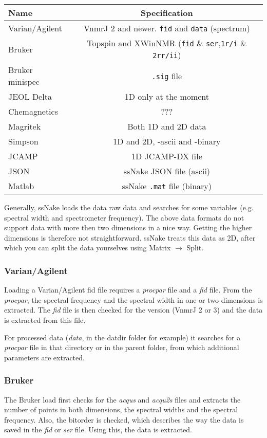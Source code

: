 \documentclass[11pt,a4paper]{article}
\begin{document}
\begin{center}
\begin{tabular}{lc}
\toprule
Name & Specification \\
\midrule
\rowcolor{gray!30!white}
Varian/Agilent & VnmrJ 2 and newer. \texttt{fid} and \texttt{data} (spectrum)\\
Bruker & Topspin and XWinNMR (\texttt{fid} \& \texttt{ser},\texttt{1r/i} \& \texttt{2rr/ii}) \\
\rowcolor{gray!30!white}
Bruker minispec  & \texttt{.sig} file\\
JEOL Delta & 1D only at the moment \\
\rowcolor{gray!30!white}
Chemagnetics & ??? \\
Magritek & Both 1D and 2D data \\
\rowcolor{gray!30!white}
Simpson & 1D and 2D, -ascii and -binary \\
JCAMP & 1D JCAMP-DX file\\
\rowcolor{gray!30!white}
JSON & ssNake JSON file (ascii)\\
Matlab & ssNake \texttt{.mat} file (binary)\\
\bottomrule
\end{tabular}
\end{center}

Generally, ssNake loads the data raw data and searches for some variables (e.g. spectral width and spectrometer frequency). The above data formats do not support data with more then two dimensions in a nice way. Getting the higher dimensions is therefore not straightforward. ssNake treats this data as 2D, after which you can split the data yourselves using Matrix $\rightarrow$ Split.

\subsubsection*{Varian/Agilent}
Loading a Varian/Agilent fid file requires a \textit{procpar} file and a \textit{fid} file. From the \textit{procpar}, the spectral frequency and the spectral width in one or two dimensions is extracted. The \textit{fid} file is then checked for the version (VnmrJ 2 or 3) and the data is extracted from this file.

For processed data (\textit{data}, in the datdir folder for example) it searches for a \textit{procpar} file in that directory or in the parent folder, from which additional parameters are extracted.

\subsubsection*{Bruker}
The Bruker load first checks for the \textit{acqus} and \textit{acqu2s} files and extracts the number of points in both dimensions, the spectral widths and the spectral frequency. Also, the bitorder is checked, which describes the way the data is saved in the \textit{fid} or \textit{ser} file. Using this, the data is extracted.
\end{document}
